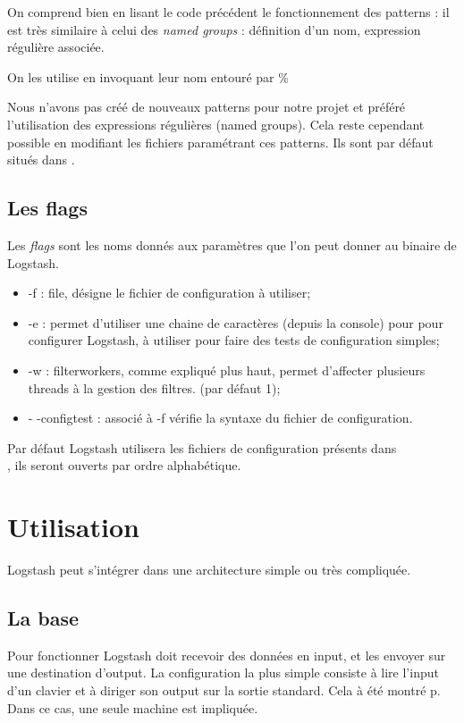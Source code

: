 On comprend bien en lisant le code précédent le fonctionnement des patterns : il est
très similaire à celui des \textit{named groups} : définition d'un nom, expression
régulière associée. 

On les utilise en invoquant leur nom entouré par \%{} 

Nous n'avons pas créé de nouveaux patterns pour notre projet et préféré l'utilisation
des expressions régulières (named groups). Cela reste cependant possible en modifiant les fichiers 
paramétrant ces patterns. Ils sont par défaut situés dans .


\subsection{Les flags}
\label{subsec:logstashflag}
Les \emph{flags} sont les noms donnés aux paramètres que l'on peut donner au binaire
de Logstash.

\begin{itemize}
    \item -f : file, désigne le fichier de configuration à utiliser;
    \item -e : permet d'utiliser une chaine de caractères (depuis la console) pour
    pour configurer Logstash, à utiliser pour faire des tests de configuration simples;
    \item -w : filterworkers, comme expliqué plus haut, permet d'affecter plusieurs
    threads à la gestion des filtres. (par défaut 1);
    \item - -configtest : associé à -f  vérifie la syntaxe 
    du fichier de configuration.
\end{itemize}

Par défaut Logstash utilisera les fichiers de configuration présents dans \\ 
, ils seront ouverts par ordre alphabétique.

\section{Utilisation}
Logstash peut s'intégrer dans une architecture simple ou très compliquée. 


\subsection{La base}
Pour fonctionner Logstash doit recevoir des données en input, et les envoyer sur 
une destination d'output.
La configuration la plus simple consiste à lire l'input d'un clavier et à diriger 
son output sur la sortie standard. Cela à été montré p\pageref{lst:conflogstashminimale}.
Dans ce cas, une seule machine est impliquée. 



